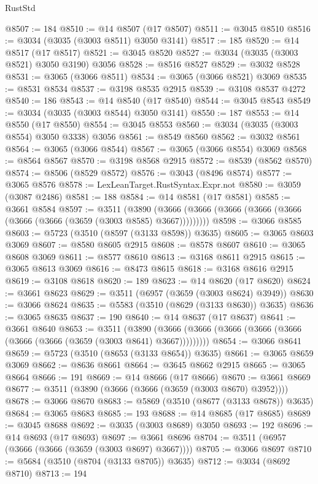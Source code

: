 \begin{lexlean}{RustStd}
\begin{coremodule}
@8507 := 184
@8510 := @14 @8507 (@17 @8507)
@8511 := @3045 @8510
@8516 := @3034 (@3035 (@3003 @8511) @3050 @3141)
@8517 := 185
@8520 := @14 @8517 (@17 @8517)
@8521 := @3045 @8520
@8527 := @3034 (@3035 (@3003 @8521) @3050 @3190) @3056
@8528 := @8516 @8527
@8529 := @3032 @8528
@8531 := @3065 (@3066 @8511)
@8534 := @3065 (@3066 @8521) @3069
@8535 := @8531 @8534
@8537 := @3198 @8535 @2915
@8539 := @3108 @8537 @4272
@8540 := 186
@8543 := @14 @8540 (@17 @8540)
@8544 := @3045 @8543
@8549 := @3034 (@3035 (@3003 @8544) @3050 @3141)
@8550 := 187
@8553 := @14 @8550 (@17 @8550)
@8554 := @3045 @8553
@8560 := @3034 (@3035 (@3003 @8554) @3050 @3338) @3056
@8561 := @8549 @8560
@8562 := @3032 @8561
@8564 := @3065 (@3066 @8544)
@8567 := @3065 (@3066 @8554) @3069
@8568 := @8564 @8567
@8570 := @3198 @8568 @2915
@8572 := @8539 (@8562 @8570)
@8574 := @8506 (@8529 @8572)
@8576 := @3043 (@8496 @8574)
@8577 := @3065 @8576
@8578 := LexLeanTarget.RustSyntax.Expr.not
@8580 := @3059 (@3087 @2486)
@8581 := 188
@8584 := @14 @8581 (@17 @8581)
@8585 := @3661 @8584
@8597 := @3511
    (@3890 (@3666 (@3666 (@3666 (@3666 (@3666 (@3666 (@3666 (@3659 (@3003 @8585) @3667)))))))))
@8598 := @3066 @8585
@8603 := @5723 (@3510 (@8597 (@3133 @8598)) @3635)
@8605 := @3065 @8603 @3069
@8607 := @8580 @8605 @2915
@8608 := @8578 @8607
@8610 := @3065 @8608 @3069
@8611 := @8577 @8610
@8613 := @3168 @8611 @2915
@8615 := @3065 @8613 @3069
@8616 := @8473 @8615
@8618 := @3168 @8616 @2915
@8619 := @3108 @8618
@8620 := 189
@8623 := @14 @8620 (@17 @8620)
@8624 := @3661 @8623
@8629 := @3511 (@6957 (@3659 (@3003 @8624) @3949))
@8630 := @3066 @8624
@8635 := @5583 (@3510 (@8629 (@3133 @8630)) @3635)
@8636 := @3065 @8635
@8637 := 190
@8640 := @14 @8637 (@17 @8637)
@8641 := @3661 @8640
@8653 := @3511
    (@3890 (@3666 (@3666 (@3666 (@3666 (@3666 (@3666 (@3666 (@3659 (@3003 @8641) @3667)))))))))
@8654 := @3066 @8641
@8659 := @5723 (@3510 (@8653 (@3133 @8654)) @3635)
@8661 := @3065 @8659 @3069
@8662 := @8636 @8661
@8664 := @3645 @8662 @2915
@8665 := @3065 @8664
@8666 := 191
@8669 := @14 @8666 (@17 @8666)
@8670 := @3661 @8669
@8677 := @3511 (@3890 (@3666 (@3666 (@3659 (@3003 @8670) @3952))))
@8678 := @3066 @8670
@8683 := @5869 (@3510 (@8677 (@3133 @8678)) @3635)
@8684 := @3065 @8683
@8685 := 193
@8688 := @14 @8685 (@17 @8685)
@8689 := @3045 @8688
@8692 := @3035 (@3003 @8689) @3050
@8693 := 192
@8696 := @14 @8693 (@17 @8693)
@8697 := @3661 @8696
@8704 := @3511 (@6957 (@3666 (@3666 (@3659 (@3003 @8697) @3667))))
@8705 := @3066 @8697
@8710 := @5684 (@3510 (@8704 (@3133 @8705)) @3635)
@8712 := @3034 (@8692 @8710)
@8713 := 194

\end{coremodule}
\end{lexlean}
